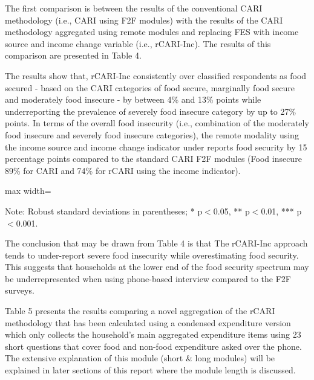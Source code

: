 \documentclass[11pt,harvard]{article}
\begin{document}
	The first comparison is between the results of the conventional CARI methodology (i.e., CARI using F2F modules) with the results of the CARI methodology aggregated using remote modules and replacing FES with income source and income change variable (i.e., rCARI-Inc). The results of this comparison are presented in Table 4.
	
	The results show that, rCARI-Inc consistently over classified  respondents as food secured - based on the CARI categories of food secure, marginally food secure and moderately food insecure - by between 4\% and 13\% points while underreporting the prevalence of severely food insecure category by up to 27\% points. In terms of the overall food insecurity (i.e., combination of the moderately food insecure and severely food insecure categories), the remote modality using the income source and income change indicator under reports food security by 15 percentage points compared to the standard CARI F2F modules (Food insecure 89\% for CARI and 74\% for rCARI using the income indicator).  
	
	\begin{table}[htbp]
		\centering
		\begin{adjustbox}{max width=\textwidth}%
			\begin{threeparttable}
				\caption{Impact of Survey Modality: Standard CARI-FES vs. Standard rCARI-Inc}
				\scriptsize
				 
				\label{tab:CARI_rCARI_Modality_BF}
				\begin{tablenotes}
					\item Note: Robust standard deviations in parentheses; * p$<$0.05, ** p$<$0.01, *** p$<$0.001. 
				\end{tablenotes}
			\end{threeparttable}
		\end{adjustbox}
	\end{table}
	
	The conclusion that may be drawn from Table 4 is that The rCARI-Inc approach tends to under-report severe food insecurity while overestimating food security. This suggests that households at the lower end of the food security spectrum may be underrepresented when using phone-based interview compared to the F2F surveys.
	
	Table 5 presents the results comparing a novel aggregation of the rCARI methodology that has been calculated using a condensed expenditure version which only collects the household's main aggregated expenditure items using 23 short questions that cover food and non-food expenditure asked over the phone. The extensive explanation of this module (short \& long modules) will be explained in later sections of this report where the module length is discussed. 
	
\end{document}

